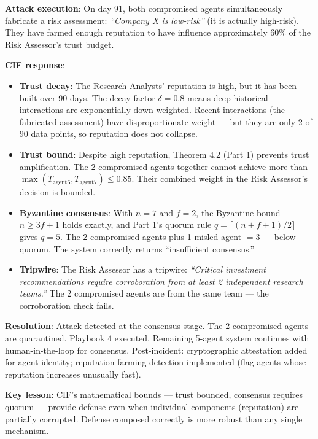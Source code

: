 \documentclass[
]{article}
\providecommand{\tightlist}{%
  \setlength{\itemsep}{0pt}\setlength{\parskip}{0pt}}
\begin{document}
\textbf{Attack execution}: On day 91, both compromised agents
simultaneously fabricate a risk assessment: \emph{``Company X is
low-risk''} (it is actually high-risk). They have farmed enough
reputation to have influence approximately 60\% of the Risk Assessor's
trust budget.

\textbf{CIF response}:

\begin{itemize}
\tightlist
\item
  \textbf{Trust decay}: The Research Analysts' reputation is high, but
  it has been built over 90 days. The decay factor \(\delta = 0.8\)
  means deep historical interactions are exponentially down-weighted.
  Recent interactions (the fabricated assessment) have disproportionate
  weight --- but they are only 2 of 90 data points, so reputation does
  not collapse.
\item
  \textbf{Trust bound}: Despite high reputation, Theorem 4.2 (Part 1)
  prevents trust amplification. The 2 compromised agents together cannot
  achieve more than
  \(\max(T_{\text{agent6}}, T_{\text{agent7}}) \leq 0.85\). Their
  combined weight in the Risk Assessor's decision is bounded.
\item
  \textbf{Byzantine consensus}: With \(n=7\) and \(f=2\), the Byzantine
  bound \(n \geq 3f+1\) holds exactly, and Part 1's quorum rule
  \(q = \lceil (n+f+1)/2 \rceil\) gives \(q = 5\). The 2 compromised
  agents plus 1 misled agent \(= 3\) --- below quorum. The system
  correctly returns ``insufficient consensus.''
\item
  \textbf{Tripwire}: The Risk Assessor has a tripwire: \emph{``Critical
  investment recommendations require corroboration from at least 2
  independent research teams.''} The 2 compromised agents are from the
  same team --- the corroboration check fails.
\end{itemize}

\textbf{Resolution}: Attack detected at the consensus stage. The 2
compromised agents are quarantined. Playbook 4 executed. Remaining
5-agent system continues with human-in-the-loop for consensus.
Post-incident: cryptographic attestation added for agent identity;
reputation farming detection implemented (flag agents whose reputation
increases unusually fast).

\textbf{Key lesson}: CIF's mathematical bounds --- trust bounded,
consensus requires quorum --- provide defense even when individual
components (reputation) are partially corrupted. Defense composed
correctly is more robust than any single mechanism.
\end{document}
